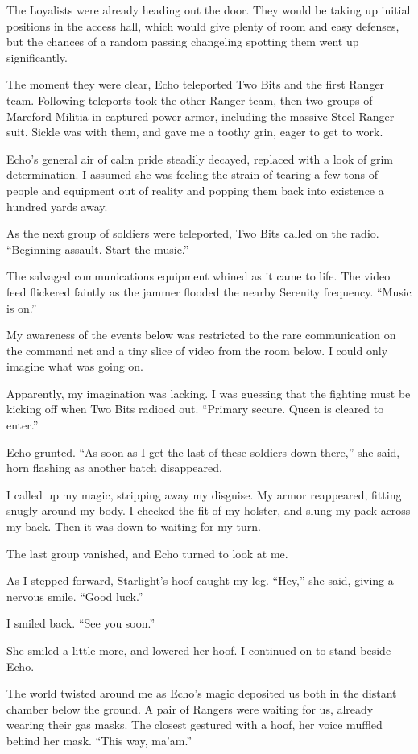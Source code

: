 The Loyalists were already heading out the door. They would be taking up initial positions in the access hall, which would give plenty of room and easy defenses, but the chances of a random passing changeling spotting them went up significantly.

The moment they were clear, Echo teleported Two Bits and the first Ranger team. Following teleports took the other Ranger team, then two groups of Mareford Militia in captured power armor, including the massive Steel Ranger suit. Sickle was with them, and gave me a toothy grin, eager to get to work.

Echo’s general air of calm pride steadily decayed, replaced with a look of grim determination. I assumed she was feeling the strain of tearing a few tons of people and equipment out of reality and popping them back into existence a hundred yards away.

As the next group of soldiers were teleported, Two Bits called on the radio. “Beginning assault. Start the music.”

The salvaged communications equipment whined as it came to life. The video feed flickered faintly as the jammer flooded the nearby Serenity frequency. “Music is on.”

My awareness of the events below was restricted to the rare communication on the command net and a tiny slice of video from the room below. I could only imagine what was going on.

Apparently, my imagination was lacking. I was guessing that the fighting must be kicking off when Two Bits radioed out. “Primary secure. Queen is cleared to enter.”

Echo grunted. “As soon as I get the last of these soldiers down there,” she said, horn flashing as another batch disappeared.

I called up my magic, stripping away my disguise. My armor reappeared, fitting snugly around my body. I checked the fit of my holster, and slung my pack across my back. Then it was down to waiting for my turn.

The last group vanished, and Echo turned to look at me.

As I stepped forward, Starlight’s hoof caught my leg. “Hey,” she said, giving a nervous smile. “Good luck.”

I smiled back. “See you soon.”

She smiled a little more, and lowered her hoof. I continued on to stand beside Echo.

The world twisted around me as Echo’s magic deposited us both in the distant chamber below the ground. A pair of Rangers were waiting for us, already wearing their gas masks. The closest gestured with a hoof, her voice muffled behind her mask. “This way, ma’am.”


